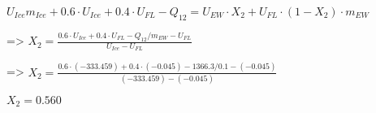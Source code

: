 \( U_{Ice} m_{Ice} + 0.6 \cdot U_{Ice} + 0.4 \cdot U_{FL} - Q_{12} = U_{EW} \cdot X_2 + U_{FL} \cdot (1 - X_2) \cdot m_{EW} \)  

=> \( X_2 = \frac{0.6 \cdot U_{Ice} + 0.4 \cdot U_{FL} - Q_{12} / m_{EW} - U_{FL}}{U_{Ice} - U_{FL}} \)  

=> \( X_2 = \frac{0.6 \cdot (-333.459) + 0.4 \cdot (-0.045) - 1366.3 / 0.1 - (-0.045)}{(-333.459) - (-0.045)} \)  

\( X_2 = 0.560 \)